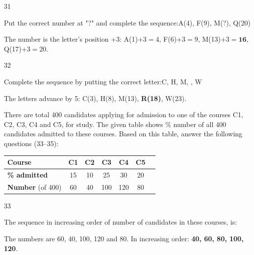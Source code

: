 \begin{question}{31}
{Put the correct number at "?" and complete the sequence:\newline A(4), F(9), M(?), Q(20)\par}
\begin{explain}
The number is the letter's position $+3$: A(1)$+3=4$, F(6)$+3=9$, M(13)$+3=\mathbf{16}$, Q(17)$+3=20$.
\end{explain}
\end{question}

\begin{question}{32}
{Complete the sequence by putting the correct letter:\newline C, H, M, \blank{}, W\par}
\begin{explain}
The letters advance by 5: C(3), H(8), M(13), \textbf{R(18)}, W(23).
\end{explain}
\end{question}

\begin{context}
There are total 400 candidates applying for admission to one of the courses C1, C2, C3, C4 and C5, for study. The given table shows \% number of all 400 candidates admitted to these courses. Based on this table, answer the following questions (33--35):
\begin{center}
\begin{tabular}{lcccccc}\toprule \textbf{Course} & C1 & C2 & C3 & C4 & C5\\\midrule
\textbf{\% admitted} & 15 & 10 & 25 & 30 & 20\\
\textbf{Number} (of 400) & 60 & 40 & 100 & 120 & 80\\\bottomrule
\end{tabular}
\end{center}
\end{context}
\begin{question}{33}
{The sequence in increasing order of number of candidates in these courses, is:\par}
\begin{explain}
The numbers are 60, 40, 100, 120 and 80. In increasing order: \textbf{40, 60, 80, 100, 120}.
\end{explain}
\end{question}

